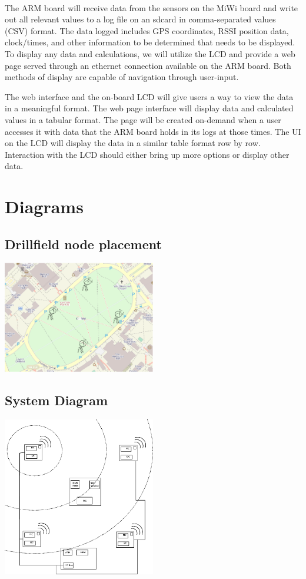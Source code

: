 \documentclass{article}
\begin{document}
\paragraph*{}
The ARM board will receive data from the sensors on the MiWi board and write out all relevant values to a log file on an sdcard in comma-separated values (CSV) format. The data logged includes GPS coordinates, RSSI position data, clock/times, and other information to be determined that needs to be displayed. To display any data and calculations, we will utilize the LCD and provide a web page served through an ethernet connection available on the ARM board. Both methods of display are capable of navigation through user-input.

The web interface and the on-board LCD will give users a way to view the data in a meaningful format. The web page interface will display data and calculated values in a tabular format. The page will be created on-demand when a user accesses it with data that the ARM board holds in its logs at those times. The UI on the LCD will display the data in a similar table format row by row. Interaction with the LCD should either bring up more options or display other data.

\section*{Diagrams}
\subsection*{Drillfield node placement}
\includegraphics[width=0.5\textwidth]{node_placement}
\subsection*{System Diagram}
\includegraphics[width=0.5\textwidth]{system}
\end{document}

